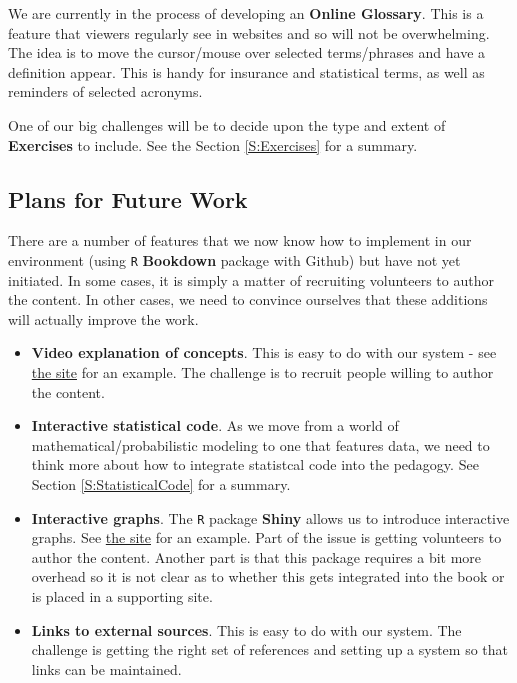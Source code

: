 \documentclass[
]{book}
\begin{document}
We are currently in the process of developing an \textbf{Online Glossary}. This is a feature that viewers regularly see in websites and so will not be overwhelming. The idea is to move the cursor/mouse over selected terms/phrases and have a definition appear. This is handy for insurance and statistical terms, as well as reminders of selected acronyms.

One of our big challenges will be to decide upon the type and extent of \textbf{Exercises} to include. See the Section \ref{S:Exercises} for a summary.

\hypertarget{plans-for-future-work}{%
\subsection{Plans for Future Work}\label{plans-for-future-work}}

There are a number of features that we now know how to implement in our environment (using \texttt{R} \textbf{Bookdown} package with Github) but have not yet initiated. In some cases, it is simply a matter of recruiting volunteers to author the content. In other cases, we need to convince ourselves that these additions will actually improve the work.

\begin{itemize}
\item
  \textbf{Video explanation of concepts}. This is easy to do with our system - see \href{https://ewfreesres.github.io/RegressModel/index.html}{the site} for an example. The challenge is to recruit people willing to author the content.
\item
  \textbf{Interactive statistical code}. As we move from a world of mathematical/probabilistic modeling to one that features data, we need to think more about how to integrate statistcal code into the pedagogy. See Section \ref{S:StatisticalCode} for a summary.
\item
  \textbf{Interactive graphs}. The \texttt{R} package \textbf{Shiny} allows us to introduce interactive graphs. See \href{https://ewfrees.github.io/LDARcode/index.html\#32_gamma_distribution}{the site} for an example. Part of the issue is getting volunteers to author the content. Another part is that this package requires a bit more overhead so it is not clear as to whether this gets integrated into the book or is placed in a supporting site.
\item
  \textbf{Links to external sources}. This is easy to do with our system. The challenge is getting the right set of references and setting up a system so that links can be maintained.
\end{itemize}
\end{document}

